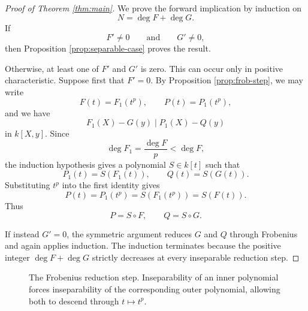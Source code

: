 \documentclass[12pt]{article}
\begin{document}
\begin{proof}[Proof of Theorem \ref{thm:main}]
We prove the forward implication by induction on
\[
    N=\deg F+\deg G.
\]
If
\[
    F'\neq0
    \qquad\text{and}\qquad
    G'\neq0,
\]
then Proposition \ref{prop:separable-case} proves the result.

Otherwise, at least one of \(F'\) and \(G'\) is zero.  This can occur only in positive characteristic.  Suppose first that \(F'=0\).  By Proposition \ref{prop:frob-step}, we may write
\[
    F(t)=F_1(t^p),
    \qquad
    P(t)=P_1(t^p),
\]
and we have
\[
    F_1(X)-G(y)
    \mid
    P_1(X)-Q(y)
\]
in \(k[X,y]\).  Since
\[
    \deg F_1=\frac{\deg F}{p}<\deg F,
\]
the induction hypothesis gives a polynomial \(S\in k[t]\) such that
\[
    P_1(t)=S(F_1(t)),
    \qquad
    Q(t)=S(G(t)).
\]
Substituting \(t^p\) into the first identity gives
\[
    P(t)=P_1(t^p)=S(F_1(t^p))=S(F(t)).
\]
Thus
\[
    P=S\circ F,
    \qquad
    Q=S\circ G.
\]

If instead \(G'=0\), the symmetric argument reduces \(G\) and \(Q\) through Frobenius and again applies induction.  The induction terminates because the positive integer \(\deg F+\deg G\) strictly decreases at every inseparable reduction step.
\end{proof}

\begin{figure}[htbp]
\centering
{}
\caption{The Frobenius reduction step.  Inseparability of an inner polynomial forces inseparability of the corresponding outer polynomial, allowing both to descend through \(t\mapsto t^p\).}
\end{figure}
\end{document}
